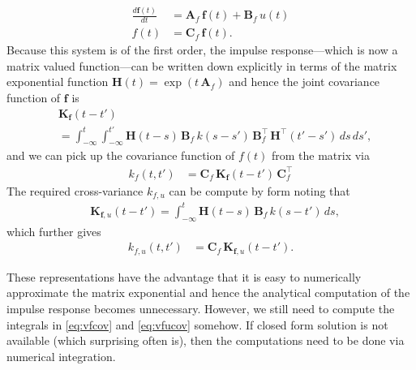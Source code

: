 \documentclass[journal]{IEEEtran}
\begin{document}
%
\begin{equation}
\begin{split}
  \frac{d\mathbf{f}(t)}{dt}
  &= \mathbf{A}_f \, \mathbf{f}(t) + \mathbf{B}_f \, u(t) \\
  f(t) &= \mathbf{C}_f \, \mathbf{f}(t).
\end{split}
\label{eq:ssgen}
\end{equation}
%
Because this system is of the first order, the impulse response---which is now a matrix valued function---can be written down explicitly in terms of the matrix exponential function $\mathbf{H}(t) = \exp(t \, \mathbf{A}_f)$ and hence the joint covariance function of $\mathbf{f}$ is
%
\begin{equation}
\begin{split}
  &\mathbf{K}_\mathbf{f}(t - t')
  \\ &
  =
  \int_{-\infty}^{t} \int_{-\infty}^{t'}
  \mathbf{H}(t - s) \, \mathbf{B}_f \, k(s - s') \,
  \mathbf{B}_f^{\top} \, \mathbf{H}^{\top}(t' - s') \, ds \, ds',
\end{split}
\label{eq:vfcov}
\end{equation}
%
and we can pick up the covariance function of $f(t)$ from the matrix via
%
\begin{equation}
\begin{split}
  k_f(t,t') &=
  \mathbf{C}_f \, \mathbf{K}_\mathbf{f}(t - t') \, \mathbf{C}_f^{\top}
\end{split}
\label{eq:fcov2}
\end{equation}
%
The required cross-variance $k_{f,u}$ can be compute by form noting that
%
\begin{equation}
\begin{split}
  &\mathbf{K}_{\mathbf{f},u}(t - t')
  =
  \int_{-\infty}^{t} 
  \mathbf{H}(t - s) \, \mathbf{B}_f \, k(s - t') \, ds,
\end{split}
\label{eq:vfucov}
\end{equation}
%
which further gives
%
\begin{equation}
\begin{split}
  k_{f,u}(t,t') &=
  \mathbf{C}_f \, \mathbf{K}_{\mathbf{f},u}(t - t').
\end{split}
\label{eq:fucov2}
\end{equation}

These representations have the advantage that it is easy to numerically approximate the matrix exponential and hence the analytical computation of the impulse response becomes unnecessary. However, we still need to compute the integrals in \eqref{eq:vfcov} and \eqref{eq:vfucov} somehow. If closed form solution is not available (which surprising often is), then the computations need to be done via numerical integration.
\end{document}
